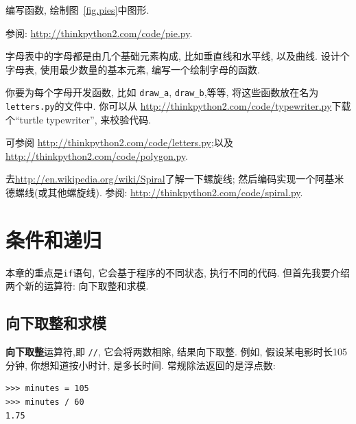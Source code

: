 \documentclass[10pt]{book}
\begin{document}
\begin{exercise}

编写函数, 绘制图~\ref{fig.pies}中图形. 

参阅: \url{http://thinkpython2.com/code/pie.py}.

\end{exercise}

\begin{exercise}

字母表中的字母都是由几个基础元素构成, 比如垂直线和水平线, 以及曲线. 
设计个字母表, 使用最少数量的基本元素, 编写一个绘制字母的函数. 

你要为每个字母开发函数, 比如 \verb"draw_a", \verb"draw_b",等等, 
将这些函数放在名为{\tt letters.py}的文件中. 
你可以从 \url{http://thinkpython2.com/code/typewriter.py}下载个``turtle typewriter'', 
来校验代码. 

可参阅 \url{http://thinkpython2.com/code/letters.py};以及
\url{http://thinkpython2.com/code/polygon.py}.

\end{exercise}

\begin{exercise}

去\url{http://en.wikipedia.org/wiki/Spiral}了解一下螺旋线;
然后编码实现一个阿基米德螺线(或其他螺旋线). 
参阅: \url{http://thinkpython2.com/code/spiral.py}.

\end{exercise}


\chapter{条件和递归}

本章的重点是{\tt if}语句, 
它会基于程序的不同状态, 执行不同的代码. 
但首先我要介绍两个新的运算符: 向下取整和求模. 

\section{向下取整和求模}

{\bf 向下取整}运算符,即 \verb"//", 
它会将两数相除, 结果向下取整. 
例如, 假设某电影时长105分钟, 你想知道按小时计, 是多长时间. 
常规除法返回的是浮点数:

\begin{verbatim}
>>> minutes = 105
>>> minutes / 60
1.75
\end{verbatim}
\end{document}

